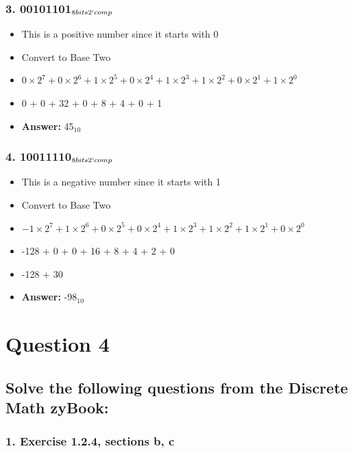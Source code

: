 \documentclass[11pt, oneside]{article}
\begin{document}
\subsubsection*{3. 00101101$_{8 bits 2` comp}$}

\begin{itemize}
    \item This is a positive number since it starts with 0
    \item Convert to Base Two
    \item \(0\times2^7 + 0\times2^6 + 1\times2^5 + 0\times2^4 + 1\times2^3 + 1\times2^2 + 0\times2^1 + 1\times2^0\)
    \item 0 + 0 + 32 + 0 + 8 + 4 + 0 + 1
    \item \textbf{Answer:} 45$_{10}$
\end{itemize}

\subsubsection*{4. 10011110$_{8 bits 2` comp}$}

\begin{itemize}
    \item This is a negative number since it starts with 1
    \item Convert to Base Two
    \item \(-1\times2^7 + 1\times2^6 + 0\times2^5 + 0\times2^4 + 1\times2^3 + 1\times2^2 + 1\times2^1 + 0\times2^0\)
    \item -128 + 0 + 0 + 16 + 8 + 4 + 2 + 0
    \item -128 + 30
    \item \textbf{Answer:} -98$_{10}$
\end{itemize}

\pagebreak

\section*{Question 4}

\subsection*{Solve the following questions from the Discrete Math zyBook:}

\subsubsection*{1. Exercise 1.2.4, sections b, c}
\end{document}
